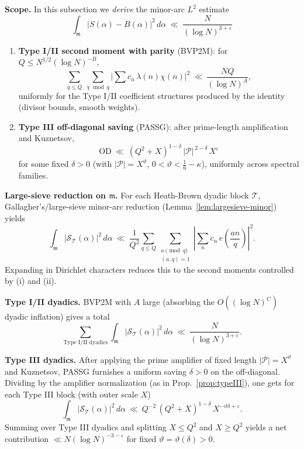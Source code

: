 \documentclass[11pt]{article}
\theoremstyle{definition}
\theoremstyle{remark}
\numberwithin{equation}{part}
\begin{document}
\noindent\textbf{Scope.} In this subsection we \emph{derive} the minor-arc $L^2$ estimate
\[\int_{\mathfrak m}|S(\alpha)-B(\alpha)|^2\,d\alpha\ \ll\ \frac{N}{(\log N)^{3+\varepsilon}}\]
\begin{enumerate}[label=(\roman*)]
	\item \textbf{Type I/II second moment with parity} (BVP2M): for $Q\le N^{1/2}(\log N)^{-B}$,
	      \[
		      \sum_{q\le Q}\ \sum_{\chi\bmod q}\Big|\sum c_n\,\lambda(n)\chi(n)\Big|^2
		      \ \ll\ \frac{NQ}{(\log N)^A},
	      \]
	      uniformly for the Type I/II coefficient structures produced by the identity (divisor bounds, smooth weights).

	\item \textbf{Type III off-diagonal saving} (PASSG): after prime-length amplification and Kuznetsov,
	      \[
		      \mathrm{OD}\ \ll\ (Q^2+X)^{1-\delta}\,|\mathcal P|^{\,2-\delta}\,X^{\varepsilon}
	      \]
	      for some fixed $\delta>0$ (with $|\mathcal P|=X^\vartheta$, $0<\vartheta<\tfrac16-\kappa$), uniformly across spectral families.
\end{enumerate}

\medskip
\noindent\textbf{Large-sieve reduction on $\mathfrak m$.} For each Heath-Brown dyadic block $\mathcal T$, Gallagher’s/large-sieve minor-arc reduction (Lemma~\ref{lem:largesieve-minor}) yields
\[
	\int_{\mathfrak m}\big|\mathcal S_{\mathcal T}(\alpha)\big|^2\,d\alpha
	\ \ll\ \frac{1}{Q^2}\sum_{q\le Q}\sum_{\substack{a\!\!\!\pmod q\\(a,q)=1}}
	\left|\sum_n c_n\,e\!\left(\frac{an}{q}\right)\right|^2.
\]
Expanding in Dirichlet characters reduces this to the second moments controlled by (i) and (ii).

\medskip
\noindent\textbf{Type I/II dyadics.} BVP2M with $A$ large (absorbing the $O((\log N)^C)$ dyadic inflation) gives a total
\[
	\sum_{\text{Type I/II dyadics}}
	\int_{\mathfrak m}\big|\mathcal S_{\mathcal T}(\alpha)\big|^2\,d\alpha
	\ \ll\ \frac{N}{(\log N)^{3+\varepsilon}}.
\]

\medskip
\noindent\textbf{Type III dyadics.} After applying the prime amplifier of fixed length $|\mathcal P|=X^\vartheta$ and Kuznetsov, PASSG furnishes a uniform saving $\delta>0$ on the off-diagonal. Dividing by the amplifier normalization (as in Prop.~\ref{prop:typeIII}), one gets for each Type III block (with outer scale $X$)
\[
	\int_{\mathfrak m}\big|\mathcal S_{\mathcal T}(\alpha)\big|^2\,d\alpha
	\ \ll\ Q^{-2}\,(Q^2+X)^{1-\delta}\,X^{-\vartheta\delta+\varepsilon}.
\]
Summing over Type III dyadics and splitting $X\le Q^2$ and $X\ge Q^2$ yields a net contribution $\ll N(\log N)^{-3-\varepsilon}$ for fixed $\vartheta=\vartheta(\delta)>0$.
\end{document}
